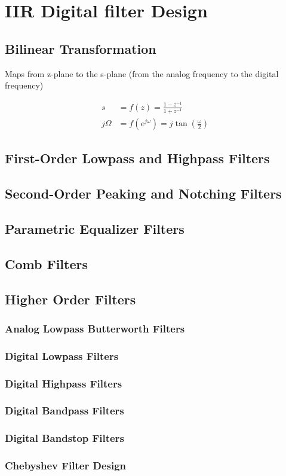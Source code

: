 \section{IIR Digital filter Design}
\subsection{Bilinear Transformation}
Maps from z-plane to the s-plane (from the analog frequency to the digital
frequency)

\begin{align}
s &= f(z) = \frac{1-z^{-1}}{1+z^{-1}}\\
j\Omega &= f(e^{j\omega}) = j \tan \left( \frac{\omega}{2} \right)
\end{align}

\subsection{First-Order Lowpass and Highpass Filters}
\subsection{Second-Order Peaking and Notching Filters}
\subsection{Parametric Equalizer Filters}
\subsection{Comb Filters}

\subsection{Higher Order Filters}
\subsubsection{Analog Lowpass Butterworth Filters}
\subsubsection{Digital Lowpass Filters}
\subsubsection{Digital Highpass Filters}
\subsubsection{Digital Bandpass Filters}
\subsubsection{Digital Bandstop Filters}
\subsubsection{Chebyshev Filter Design}

